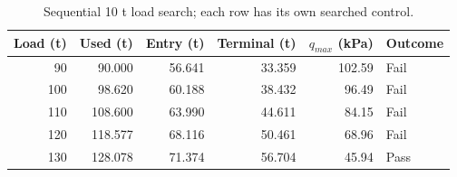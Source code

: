 \begin{table}[htbp]
\centering\small
\caption{Sequential 10 t load search; each row has its own searched control.}
\label{tab:scan}
\begin{tabularx}{\linewidth}{@{}rrrrrX@{}}
\toprule
Load (t) & Used (t) & Entry (t) & Terminal (t) & $q_{max}$ (kPa) & Outcome \\
\midrule
90 & 90.000 & 56.641 & 33.359 & 102.59 & Fail \\
100 & 98.620 & 60.188 & 38.432 & 96.49 & Fail \\
110 & 108.600 & 63.990 & 44.611 & 84.15 & Fail \\
120 & 118.577 & 68.116 & 50.461 & 68.96 & Fail \\
130 & 128.078 & 71.374 & 56.704 & 45.94 & Pass \\
\bottomrule
\end{tabularx}
\par{}
\end{table}
